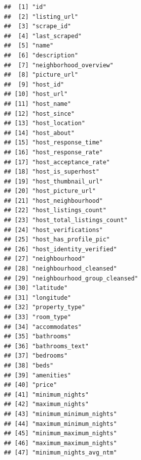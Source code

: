 \begin{verbatim}
##  [1] "id"                                          
##  [2] "listing_url"                                 
##  [3] "scrape_id"                                   
##  [4] "last_scraped"                                
##  [5] "name"                                        
##  [6] "description"                                 
##  [7] "neighborhood_overview"                       
##  [8] "picture_url"                                 
##  [9] "host_id"                                     
## [10] "host_url"                                    
## [11] "host_name"                                   
## [12] "host_since"                                  
## [13] "host_location"                               
## [14] "host_about"                                  
## [15] "host_response_time"                          
## [16] "host_response_rate"                          
## [17] "host_acceptance_rate"                        
## [18] "host_is_superhost"                           
## [19] "host_thumbnail_url"                          
## [20] "host_picture_url"                            
## [21] "host_neighbourhood"                          
## [22] "host_listings_count"                         
## [23] "host_total_listings_count"                   
## [24] "host_verifications"                          
## [25] "host_has_profile_pic"                        
## [26] "host_identity_verified"                      
## [27] "neighbourhood"                               
## [28] "neighbourhood_cleansed"                      
## [29] "neighbourhood_group_cleansed"                
## [30] "latitude"                                    
## [31] "longitude"                                   
## [32] "property_type"                               
## [33] "room_type"                                   
## [34] "accommodates"                                
## [35] "bathrooms"                                   
## [36] "bathrooms_text"                              
## [37] "bedrooms"                                    
## [38] "beds"                                        
## [39] "amenities"                                   
## [40] "price"                                       
## [41] "minimum_nights"                              
## [42] "maximum_nights"                              
## [43] "minimum_minimum_nights"                      
## [44] "maximum_minimum_nights"                      
## [45] "minimum_maximum_nights"                      
## [46] "maximum_maximum_nights"                      
## [47] "minimum_nights_avg_ntm"                      

\end{verbatim}

